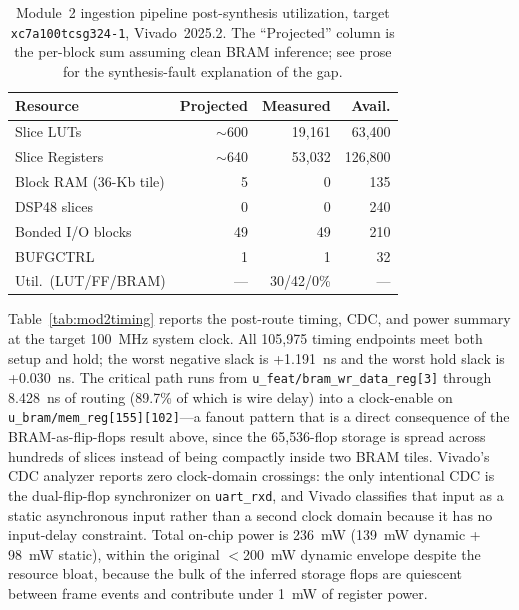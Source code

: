 \documentclass[conference]{IEEEtran}
\begin{document}
\begin{table}[t]
\centering
\caption{Module~2 ingestion pipeline post-synthesis utilization, target \texttt{xc7a100tcsg324-1}, Vivado~2025.2. The ``Projected'' column is the per-block sum assuming clean BRAM inference; see prose for the synthesis-fault explanation of the gap.}
\label{tab:mod2res}
\begin{tabular}{l r r r}
\toprule
\textbf{Resource} & \textbf{Projected} & \textbf{Measured} & \textbf{Avail.} \\
\midrule
Slice LUTs                 & $\sim$600 & 19{,}161 & 63{,}400 \\
Slice Registers            & $\sim$640 & 53{,}032 & 126{,}800 \\
Block RAM (36-Kb tile)     & 5         & 0        & 135 \\
DSP48 slices               & 0         & 0        & 240 \\
Bonded I/O blocks          & 49        & 49       & 210 \\
BUFGCTRL                   & 1         & 1        & 32 \\
Util.\ (LUT/FF/BRAM)       & --- & 30/42/0\% & --- \\
\bottomrule
\end{tabular}
\end{table}

Table~\ref{tab:mod2timing} reports the post-route timing, CDC, and power summary at the target 100~MHz system clock. All 105{,}975 timing endpoints meet both setup and hold; the worst negative slack is +1.191~ns and the worst hold slack is +0.030~ns. The critical path runs from \texttt{u\_feat/bram\_wr\_data\_reg[3]} through 8.428~ns of routing (89.7\% of which is wire delay) into a clock-enable on \texttt{u\_bram/mem\_reg[155][102]}---a fanout pattern that is a direct consequence of the BRAM-as-flip-flops result above, since the 65{,}536-flop storage is spread across hundreds of slices instead of being compactly inside two BRAM tiles. Vivado's CDC analyzer reports zero clock-domain crossings: the only intentional CDC is the dual-flip-flop synchronizer on \texttt{uart\_rxd}, and Vivado classifies that input as a static asynchronous input rather than a second clock domain because it has no input-delay constraint. Total on-chip power is 236~mW (139~mW dynamic + 98~mW static), within the original $<$200~mW dynamic envelope despite the resource bloat, because the bulk of the inferred storage flops are quiescent between frame events and contribute under 1~mW of register power.
\end{document}
